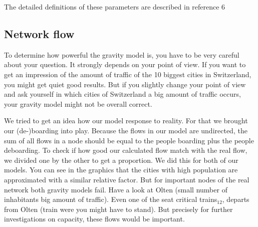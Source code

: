 \documentclass[11pt]{article}
\begin{document}
The detailed definitions of these parameters are described in reference 6 


\subsection{Network flow}

To determine how powerful the gravity model is, you have to be very careful about your question. It strongly depends on your point of view. If you want to get an impression of the amount of traffic of the 10 biggest cities in Switzerland, you might get quiet good results. But if you slightly change your point of view and ask yourself in which cities of Switzerland a big amount of traffic occurs, your gravity model might not be overall correct. 

We tried to get an idea how our model response to reality. For that we brought our (de-)boarding into play. Because the flows in our model are undirected, the sum of all flows in a node should be equal to the people boarding plus the people deboarding. To check if how good our calculated flow match with the real flow, we divided one by the other to get a proportion. We did this for both of our models. You can see in the graphics that the cities with high population are approximated with a similar relative factor. But  for important nodes of the real network both gravity models fail. Have a look at Olten (small number of inhabitants big amount of traffic). Even one of the seat critical trains$_{12}$, departs from Olten (train were you might have to stand). But precisely for further investigations on capacity, these flows would be important.
\end{document}
